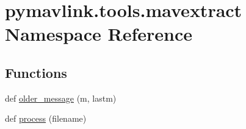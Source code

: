 \hypertarget{namespacepymavlink_1_1tools_1_1mavextract}{}\section{pymavlink.\+tools.\+mavextract Namespace Reference}
\label{namespacepymavlink_1_1tools_1_1mavextract}
\subsection*{Functions}
\begin{DoxyCompactItemize}
\item 
def \hyperlink{namespacepymavlink_1_1tools_1_1mavextract_a0695c30418a7a66ccfdd36d36e194708}{older\+\_\+message} (m, lastm)
\item 
def \hyperlink{namespacepymavlink_1_1tools_1_1mavextract_aa4c714213c51b033aae1046e5ce2e1ab}{process} (filename)
\end{DoxyCompactItemize}
